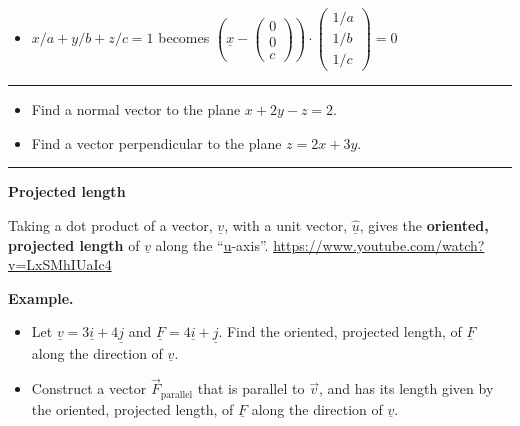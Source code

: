 \documentclass[12pt,letterpaper,noanswers]{exam}
\newcommand{\mb}[1]{\underline{#1}}
\begin{document}
\begin{itemize}
\item $x/a + y/b + z/c = 1$ becomes $\left(\underline{x}-\left(\begin{array}{c}0 \\ 0 \\ c\end{array}\right)\right)\cdot \left(\begin{array}{c}1/a \\ 1/b \\ 1/c \end{array}\right) = 0$
\end{itemize}



\vspace{0.2cm}
\hrule
\vspace{0.2cm}
\begin{itemize}
\item Find a normal vector to the plane $x + 2y - z = 2.$
\vspace{0.5cm}
\item Find a vector perpendicular to the plane $z = 2x + 3y.$
\vspace{1cm}
\end{itemize}


\vspace{0.2cm}
\hrule
\vspace{0.2cm}

\noindent\textbf{Projected length}
\begin{tcolorbox}
Taking a dot product of a vector, $\mb{v}$, with a unit vector, $\hat{\mb{u}}$, gives the \textbf{oriented, projected length} of $\mb{v}$ along the ``\mb{u}-axis''.  \url{https://www.youtube.com/watch?v=LxSMhIUaIc4}
\end{tcolorbox}

\noindent\textbf{Example.}
\begin{itemize}
\item Let $\mb{v} = 3\mb{i} + 4\mb{j}$ and $\mb{F} = 4\mb{i} + \mb{j}.$  Find the oriented, projected length, of $\mb{F}$ along the direction of $\mb{v}$.
\vspace{3cm}

\item Construct a vector $\vec F_{\text{parallel}}$ that is parallel to $\vec{v}$, and has its length given by the oriented, projected length, of $\mb{F}$ along the direction of $\mb{v}$.
\vspace{2cm}
\end{itemize}
\end{document}
